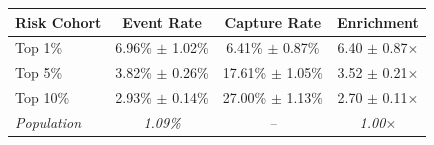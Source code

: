 \begin{tabular}{lccc}
\toprule
\textbf{Risk Cohort} & \textbf{Event Rate} & \textbf{Capture Rate} & \textbf{Enrichment} \\
\midrule
Top 1\% & 6.96\% $\pm$ 1.02\% & 6.41\% $\pm$ 0.87\% & 6.40 $\pm$ 0.87$\times$ \\
Top 5\% & 3.82\% $\pm$ 0.26\% & 17.61\% $\pm$ 1.05\% & 3.52 $\pm$ 0.21$\times$ \\
Top 10\% & 2.93\% $\pm$ 0.14\% & 27.00\% $\pm$ 1.13\% & 2.70 $\pm$ 0.11$\times$ \\
\midrule
\textit{Population} & \textit{1.09\%} & \textit{--} & \textit{1.00$\times$} \\
\bottomrule
\end{tabular}
